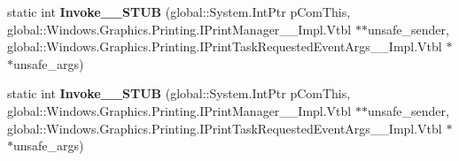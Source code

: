 \begin{DoxyCompactItemize}
static int {\bfseries Invoke\+\_\+\+\_\+\+S\+T\+UB} (global\+::\+System.\+Int\+Ptr p\+Com\+This, global\+::\+Windows.\+Graphics.\+Printing.\+I\+Print\+Manager\+\_\+\+\_\+\+Impl.\+Vtbl $\ast$$\ast$unsafe\+\_\+sender, global\+::\+Windows.\+Graphics.\+Printing.\+I\+Print\+Task\+Requested\+Event\+Args\+\_\+\+\_\+\+Impl.\+Vtbl $\ast$$\ast$unsafe\+\_\+args)
\item 
\mbox{\label{struct_windows_1_1_foundation_1_1_typed_event_handler___a___windows___graphics___printing___prindf9d13d6fccfa5e25b1b30b98b5a86a9_ac3d355442d5db04e015526601276c11a}} 
static int {\bfseries Invoke\+\_\+\+\_\+\+S\+T\+UB} (global\+::\+System.\+Int\+Ptr p\+Com\+This, global\+::\+Windows.\+Graphics.\+Printing.\+I\+Print\+Manager\+\_\+\+\_\+\+Impl.\+Vtbl $\ast$$\ast$unsafe\+\_\+sender, global\+::\+Windows.\+Graphics.\+Printing.\+I\+Print\+Task\+Requested\+Event\+Args\+\_\+\+\_\+\+Impl.\+Vtbl $\ast$$\ast$unsafe\+\_\+args)
\end{DoxyCompactItemize}
